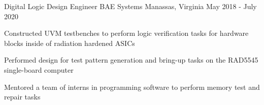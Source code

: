 \begin{cventries}
\cventry
{Digital Logic Design Engineer} %
{BAE Systems} %
{Manassas, Virginia} %
{May 2018 - July 2020} %
{ %
\begin{cvitems}
\item {Constructed UVM testbenches to perform logic verification tasks for hardware blocks inside of radiation hardened ASICs}
\item {Performed design for test pattern generation and bring-up tasks on the RAD5545 single-board computer}
\item {Mentored a team of interns in programming software to perform memory test and repair tasks}
\end{cvitems}
}






\end{cventries}